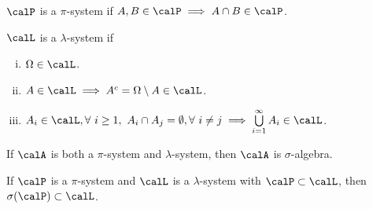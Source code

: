 \documentclass[../aipt.tex]{subfiles}
\begin{document}
\begin{Definition}
$\calP$ is a $\pi$-system if $A, B \in \calP \implies A \cap B \in \calP$.
\end{Definition}
\begin{Definition}
$\calL$ is a $\lambda$-system if 
\begin{enumerate}[(i)]
\item $\Omega \in \calL$.
\item $A \in \calL \implies A^c = \Omega \setminus A \in \calL$.
\item $A_i \in \calL, \forall\ i\geq1,\ A_i \cap A_j = \emptyset, \forall\ i \neq j \implies \bigcup\limits_{i=1}^{\infty} A_i \in \calL$.
\end{enumerate}
\end{Definition}
\begin{Remark}
If $\calA$ is both a $\pi$-system and $\lambda$-system, then $\calA$ is $\sigma$-algebra.
\end{Remark}
%
\begin{Theorem} \label{Thm:Dynkin_pi_lambda_thm}
If $\calP$ is a $\pi$-system and $\calL$ is a $\lambda$-system with $\calP \subset \calL$, then $\sigma(\calP) \subset \calL$.
\end{Theorem}
\end{document}
